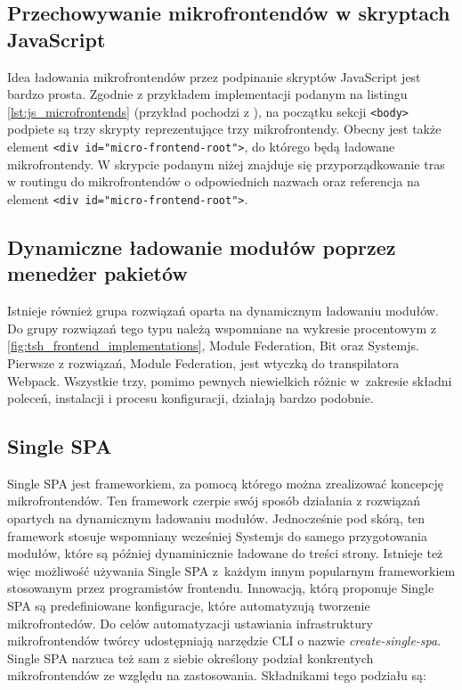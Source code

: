 \documentclass{SGGW-thesis}
\begin{document}
\subsection{Przechowywanie mikrofrontendów w skryptach JavaScript}
Idea ładowania mikrofrontendów przez podpinanie skryptów JavaScript jest bardzo prosta. Zgodnie z przykładem implementacji podanym na listingu \cref{lst:js_microfrontends} (przykład pochodzi z \cite{fowler_2019}), na początku sekcji \lstinline{<body>} podpiete są trzy skrypty reprezentujące trzy mikrofrontendy. Obecny jest także element \lstinline{<div id="micro-frontend-root">}, do którego będą ładowane mikrofrontendy. W skrypcie podanym niżej znajduje się przyporządkowanie tras w routingu do mikrofrontendów o odpowiednich nazwach oraz referencja na element \lstinline{<div id="micro-frontend-root">}.



\subsection{Dynamiczne ładowanie modułów poprzez menedżer pakietów}
Istnieje również grupa rozwiązań oparta na dynamicznym ładowaniu modułów. Do grupy rozwiązań tego typu należą wspomniane na wykresie procentowym z  \cref{fig:tsh_frontend_implementations}, Module Federation, Bit oraz Systemjs. Pierwsze z rozwiązań, Module Federation, jest wtyczką do transpilatora Webpack. Wszystkie trzy, pomimo pewnych niewielkich różnic w~zakresie składni poleceń, instalacji i procesu konfiguracji, działają bardzo podobnie.

\subsection{Single SPA}
Single SPA jest frameworkiem, za pomocą którego można zrealizować koncepcję mikrofrontendów. Ten framework czerpie swój sposób działania z rozwiązań opartych na dynamicznym ładowaniu modułów. Jednocześnie pod skórą, ten framework stosuje wspomniany wcześniej Systemjs do samego przygotowania modułów, które są później dynaminicznie ładowane do treści strony. Istnieje też więc możliwość używania Single SPA z~każdym innym popularnym frameworkiem stosowanym przez programistów frontendu. Innowacją, którą proponuje Single SPA są predefiniowane konfiguracje, które automatyzują tworzenie mikrofrontedów. Do celów automatyzacji ustawiania infrastruktury mikrofrontendów twórcy udostępniają narzędzie CLI o nazwie \textit{create-single-spa}. Single SPA narzuca też sam z siebie określony podział konkrentych mikrofrontendów ze względu na zastosowania. Składnikami tego podziału są:
\end{document}
